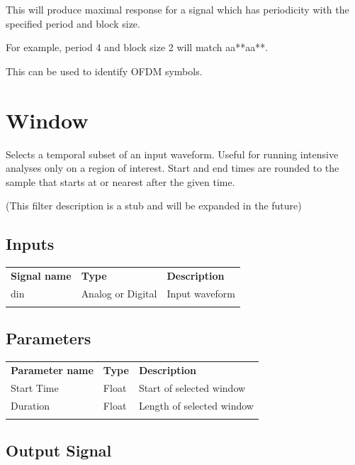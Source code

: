 This will produce maximal response for a signal which has periodicity with the specified period and block size.

For example, period 4 and block size 2 will match aa**aa**.

This can be used to identify OFDM symbols.

\pagebreak
\section{Window}

Selects a temporal subset of an input waveform. Useful for running intensive analyses only on a region of interest.
Start and end times are rounded to the sample that starts at or nearest after the given time.

(This filter description is a stub and will be expanded in the future)

\subsection{Inputs}

\begin{tabularx}{16cm}{llX}
\thickhline
\textbf{Signal name} & \textbf{Type} & \textbf{Description} \\
\thickhline
din & Analog or Digital & Input waveform \\
\thickhline
\end{tabularx}

\subsection{Parameters}

\begin{tabularx}{16cm}{llX}
\thickhline
\textbf{Parameter name} & \textbf{Type} & \textbf{Description} \\
\thickhline
Start Time & Float & Start of selected window \\
\thinhline
Duration & Float & Length of selected window \\
\thickhline
\end{tabularx}

\subsection{Output Signal}

